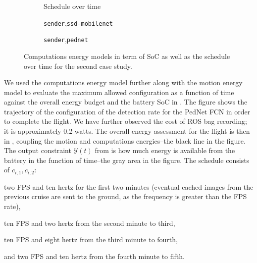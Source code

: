 \begin{figure}[t!]
  \centering
  \selectfont
  \footnotesize    
  \begin{subfigure}[b]{0.33\textwidth}
    \centering
    
    \caption{Schedule over time}
    \label{fig:max-qos}
  \end{subfigure}
  \begin{subfigure}[b]{0.32\textwidth}
    \centering
    
    \caption{{\tt\small sender},{\tt\small ssd-mobilenet}}
    \label{fig:mobilenet}
  \end{subfigure}
  \begin{subfigure}[b]{0.32\textwidth}
    \centering
    
    \caption{{\tt\small sender},{\tt\small pednet}}
    \label{fig:pednet}
  \end{subfigure}
  \caption[Computations energy models in term of SoC, schedules over time]{Computations energy models in term of SoC as well as the schedule over time for the second case study.}
  \label{fig:computational}
\end{figure}

We used the computations energy model further along with the motion energy model to evaluate the maximum allowed configuration as a function of time against the overall energy budget and the battery SoC in . The figure shows the trajectory of the configuration of the detection rate for the PedNet FCN in order to complete the flight. We have further observed the cost of ROS bag recording; it is approximately 0.2 watts.
The overall energy assessment for the flight is then in , coupling the motion and computations energies--the black line in the figure. The output constraint $\mathcal{Y}(t)$ from  is how much energy is available from the battery in the function of time--the gray area in the figure. The schedule consists of $c_{i,1},c_{i,2}$: 
\begin{enumerate*}[label={(\alph*)},font={\textit}]
  \item two FPS and ten hertz for the first two minutes (eventual cached images from the previous cruise are sent to the ground, as the frequency is greater than the FPS rate),
  \item ten FPS and two hertz from the second minute to third,
  \item ten FPS and eight hertz from the third minute to fourth, 
  \item and two FPS and ten hertz from the fourth minute to fifth.
\end{enumerate*}


